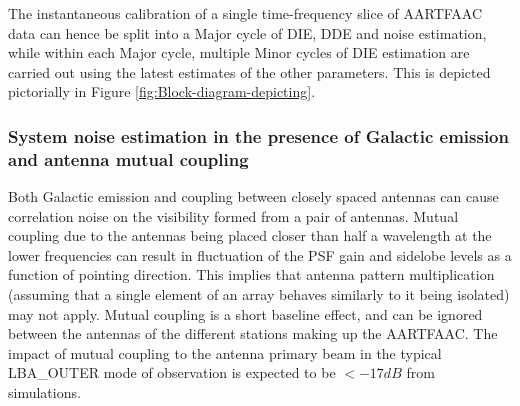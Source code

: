 \documentclass{aa}
\begin{document}
The instantaneous calibration of a  single time-frequency slice of AARTFAAC data
can hence be  split into a Major  cycle of DIE, DDE and  noise estimation, while
within each Major cycle, multiple Minor cycles of DIE estimation are carried out
using the latest estimates of the other parameters. This is depicted pictorially
in Figure \ref{fig:Block-diagram-depicting}.


\subsubsection{\label{sub:System-noise-estimation}System noise estimation in the
presence of Galactic emission and antenna mutual coupling}

Both Galactic  emission and coupling  between closely spaced antennas  can cause
correlation  noise on  the visibility  formed from  a pair  of  antennas. Mutual
coupling due to  the antennas being placed closer than half  a wavelength at the
lower frequencies can result in fluctuation  of the PSF gain and sidelobe levels
as a function of pointing direction\citep{agrawal1972mutual}.  This implies that
antenna  pattern multiplication  (assuming that  a  single element  of an  array
behaves similarly  to it  being isolated)  may not apply.  Mutual coupling  is a
short baseline effect, and can be  ignored between the antennas of the different
stations making  up the AARTFAAC. The  impact of mutual coupling  to the antenna
primary beam  in the typical  LBA\_OUTER mode of  observation is expected  to be
$<-17dB$ from simulations\citep{wijnholds2011situ}.
\end{document}
